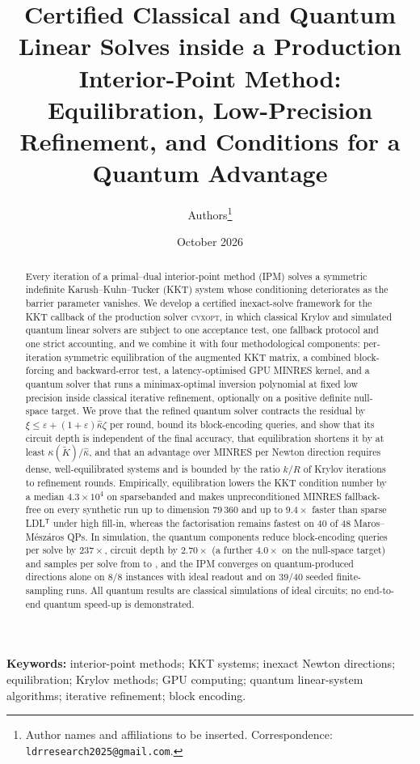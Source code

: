 \documentclass[11pt]{article}
\title{Certified Classical and Quantum Linear Solves inside a Production Interior-Point Method:\\ Equilibration, Low-Precision Refinement, and Conditions for a Quantum Advantage}
\author{Authors\thanks{Author names and affiliations to be inserted. Correspondence: \texttt{ldrresearch2025@gmail.com}.}}
\date{October 2026}
\theoremstyle{definition}
\newcommand{\Kt}{\tilde K}
\newcommand{\kh}{\hat\kappa}
\newcommand{\eps}{\varepsilon}
\newcommand{\T}{^{\mathsf T}}
\newcommand{\dsus}{\textunderscore\penalty5000\hskip0pt\relax}
\newcommand{\ds}[1]{{\ttfamily\let\_\dsus#1}}
\begin{document}
\maketitle

\begin{abstract}
Every iteration of a primal--dual interior-point method (IPM) solves a symmetric indefinite Karush--Kuhn--Tucker (KKT) system whose conditioning deteriorates as the barrier parameter vanishes. We develop a certified inexact-solve framework for the KKT callback of the production solver \textsc{cvxopt}, in which classical Krylov and simulated quantum linear solvers are subject to one acceptance test, one fallback protocol and one strict accounting, and we combine it with four methodological components: per-iteration symmetric equilibration of the augmented KKT matrix, a combined block-forcing and backward-error test, a latency-optimised GPU MINRES kernel, and a quantum solver that runs a minimax-optimal inversion polynomial at fixed low precision inside classical iterative refinement, optionally on a positive definite null-space target. We prove that the refined quantum solver contracts the residual by $\xi\le\eps+(1+\eps)\kh\zeta$ per round, bound its block-encoding queries, and show that its circuit depth is independent of the final accuracy, that equilibration shortens it by at least $\kappa(\Kt)/\kh$, and that an advantage over MINRES per Newton direction requires dense, well-equilibrated systems and is bounded by the ratio $k/R$ of Krylov iterations to refinement rounds. Empirically, equilibration lowers the KKT condition number by a median $4.3\times10^{4}$ on \ds{sparse\_banded} and makes unpreconditioned MINRES fallback-free on every synthetic run up to dimension $79\,360$ and up to $9.4\times$ faster than sparse LDL$\T$ under high fill-in, whereas the factorisation remains fastest on 40 of 48 Maros--M\'esz\'aros QPs. In simulation, the quantum components reduce block-encoding queries per solve by $237\times$, circuit depth by $2.70\times$ (a further $4.0\times$ on the null-space target) and samples per solve from \directSamples{} to , and the IPM converges on quantum-produced directions alone on 8/8 instances with ideal readout and on 39/40 seeded finite-sampling runs. All quantum results are classical simulations of ideal circuits; no end-to-end quantum speed-up is demonstrated.
\end{abstract}

\noindent\textbf{Keywords:} interior-point methods; KKT systems; inexact Newton directions; equilibration; Krylov methods; GPU computing; quantum linear-system algorithms; iterative refinement; block encoding.
\end{document}
